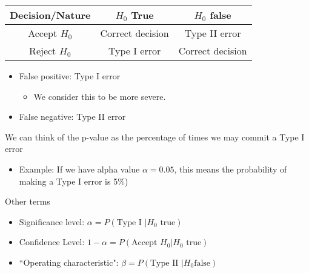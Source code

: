 \documentclass[10pt, oneside]{article}
\begin{document}
\begin{tabular}{ | c | c | c| }
\hline
Decision/Nature & $H_0$ True & $H_0$ false\\
\hline
Accept $H_0$ & Correct decision & Type II error\\
\hline
Reject $H_0$ & Type I error & Correct decision\\
\hline
\end{tabular}
\begin{itemize}
    \item False positive: Type I error
    \begin{itemize}
        \item We consider this to be more severe.
    \end{itemize}
    \item False negative: Type II error
\end{itemize}
We can think of the p-value as the percentage of times we may commit a Type I error
\begin{itemize}
    \item Example: If we have alpha value $\alpha = 0.05$, this means the probability of making a Type I error is 5\%)
\end{itemize}
Other terms
\begin{itemize}
    \item Significance level: $\alpha = P(\text{Type I }| H_0\text{ true})$
    \item Confidence Level: $1-\alpha = P(\text{Accept }H_0 | H_0\text{ true})$
    \item ``Operating characteristic": $\beta = P(\text{Type II } | H_0 \text{false})$
\end{itemize}
\end{document}
